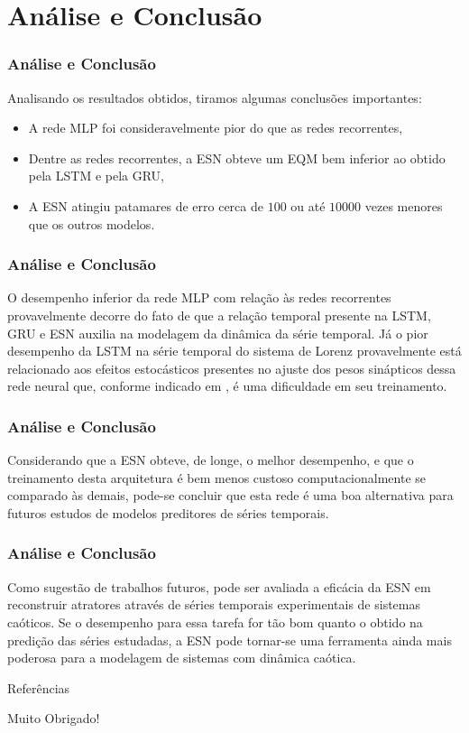 \documentclass[aspectratio=169]{beamer}
\begin{document}
\section{Análise e Conclusão}

\begin{frame}
\frametitle{Análise e Conclusão}

\justifying Analisando os resultados obtidos, tiramos algumas conclusões importantes:

    \begin{itemize}[<+-| alert@+>]   
    \item A rede MLP foi consideravelmente pior do que as redes recorrentes,
    \item Dentre as redes recorrentes, a ESN obteve um EQM bem inferior ao obtido pela LSTM e pela GRU, 
    \item A ESN  atingiu patamares de erro cerca de $100$ ou até $10000$ vezes menores que os outros modelos.
    \end{itemize}
\end{frame}

\begin{frame}
\frametitle{Análise e Conclusão}
\justifying O desempenho inferior da rede MLP com relação às redes recorrentes provavelmente decorre do fato de que a relação temporal presente na LSTM, GRU e ESN auxilia na modelagem da dinâmica da série temporal. Já o pior desempenho da LSTM na série temporal do sistema de Lorenz provavelmente está relacionado aos efeitos estocásticos presentes no ajuste dos pesos sinápticos dessa rede neural que, conforme indicado em \cite{doya1992bifurcations}, é uma dificuldade em seu treinamento.
\end{frame}

\begin{frame}
\frametitle{Análise e Conclusão}
\justifying Considerando que a ESN obteve, de longe, o melhor desempenho, e que o treinamento desta arquitetura é bem menos custoso computacionalmente se comparado às demais, pode-se concluir que esta rede é uma boa alternativa para futuros estudos de modelos preditores de séries temporais. 
\end{frame}

\begin{frame}
\frametitle{Análise e Conclusão}
\justifying Como sugestão de trabalhos futuros, pode ser avaliada a eficácia da ESN em reconstruir atratores através de séries temporais experimentais de sistemas caóticos. Se o desempenho para essa tarefa for tão bom quanto o obtido na predição das séries estudadas, a ESN pode tornar-se uma ferramenta ainda mais poderosa para a modelagem de sistemas com dinâmica caótica.
\end{frame}

\appendix

\begin{frame}{Referências}
    \tiny
    
    
\end{frame}

\begin{frame}[plain,c]
    \begin{center}
    \Huge Muito Obrigado!
    \end{center}
\end{frame}
\end{document}

